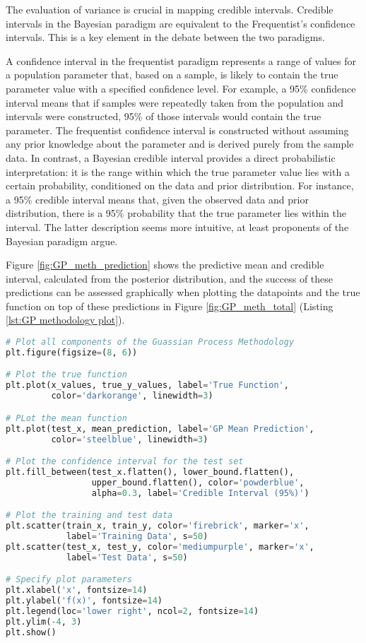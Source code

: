 \documentclass[12pt,a4paper]{article}
\begin{document}
The evaluation of variance is crucial in mapping credible intervals. Credible intervals in the Bayesian paradigm are equivalent to the Frequentist's confidence intervals. This is a key element in the debate between the two paradigms. 

A confidence interval in the frequentist paradigm represents a range of values for a population parameter that, based on a sample, is likely to contain the true parameter value with a specified confidence level. For example, a 95\% confidence interval means that if samples were repeatedly taken from the population and intervals were constructed, 95\% of those intervals would contain the true parameter. The frequentist confidence interval is constructed without assuming any prior knowledge about the parameter and is derived purely from the sample data. In contrast, a Bayesian credible interval provides a direct probabilistic interpretation: it is the range within which the true parameter value lies with a certain probability, conditioned on the data and prior distribution. For instance, a 95\% credible interval means that, given the observed data and prior distribution, there is a 95\% probability that the true parameter lies within the interval. The latter description seems more intuitive, at least proponents of the Bayesian paradigm argue.

Figure \ref{fig:GP_meth_prediction} shows the predictive mean and credible interval, calculated from the posterior distribution, and the success of these predictions can be assessed graphically when plotting the datapoints and the true function on top of these predictions in Figure \ref{fig:GP_meth_total} (Listing \ref{lst:GP methodology plot}). 

\vspace{20pt}
\begin{lstlisting}[language=python, caption={Code of the Gaussian Process Methodology plot of Figure \ref{fig:GP_meth_total.}.}, label={lst:GP methodology plot}]
# Plot all components of the Guassian Process Methodology
plt.figure(figsize=(8, 6))

# Plot the true function
plt.plot(x_values, true_y_values, label='True Function',
         color='darkorange', linewidth=3)

# PLot the mean function
plt.plot(test_x, mean_prediction, label='GP Mean Prediction',  
         color='steelblue', linewidth=3)

# Plot the confidence interval for the test set
plt.fill_between(test_x.flatten(), lower_bound.flatten(), 
                 upper_bound.flatten(), color='powderblue',
                 alpha=0.3, label='Credible Interval (95%)')

# Plot the training and test data 
plt.scatter(train_x, train_y, color='firebrick', marker='x', 
            label='Training Data', s=50)
plt.scatter(test_x, test_y, color='mediumpurple', marker='x', 
            label='Test Data', s=50)

# Specify plot parameters
plt.xlabel('x', fontsize=14)
plt.ylabel('f(x)', fontsize=14)
plt.legend(loc='lower right', ncol=2, fontsize=14)
plt.ylim(-4, 3)
plt.show()
\end{lstlisting}
\end{document}
